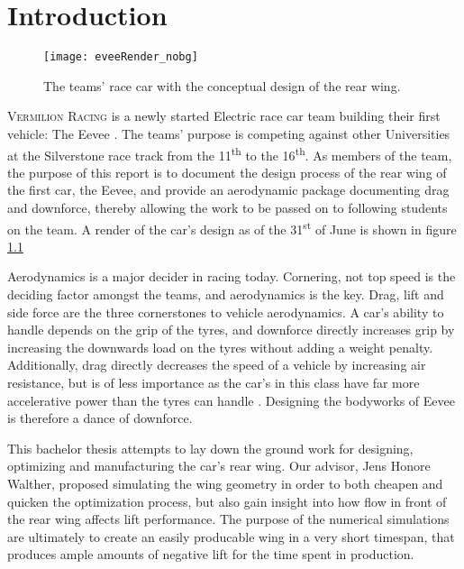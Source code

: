 \chapter{Introduction}

  \begin{figure}
    \texttt{[image: eveeRender\_nobg]}
    \caption{The teams' race car with the conceptual design of the rear wing.}
    \label{fig:EeveeRender}
  \end{figure}

  \textsc{Vermilion Racing} is a newly started Electric race car team building their first vehicle: The Eevee \cite{bulba}. The teams' purpose is competing against other Universities at the Silverstone race track from the 11\textsuperscript{th} to the 16\textsuperscript{th}. As members of the team, the purpose of this report is to document the design process of the rear wing of the first car, the Eevee, and provide an aerodynamic package documenting drag and downforce, thereby allowing the work to be passed on to following students on the team. A render of the car's design as of the 31\textsuperscript{st} of June is shown in figure \ref{fig:EeveeRender}

  Aerodynamics is a major decider in racing today. Cornering, not top speed is the deciding factor amongst the teams, and aerodynamics is the key. Drag, lift and side force are the three cornerstones to vehicle aerodynamics. A car's ability to handle depends on the grip of the tyres, and downforce directly increases grip by increasing the downwards load on the tyres without adding a weight penalty. Additionally, drag directly decreases the speed of a vehicle by increasing air resistance, but is of less importance as the car's in this class have far more accelerative power than the tyres can handle \cite{jkatz}. Designing the bodyworks of Eevee is therefore a dance of downforce.

  This bachelor thesis attempts to lay down the ground work for designing, optimizing and manufacturing the car's rear wing. Our advisor, Jens Honore Walther, proposed simulating the wing geometry in order to both cheapen and quicken the optimization process, but also gain insight into how flow in front of the rear wing affects lift performance. The purpose of the numerical simulations are ultimately to create an easily producable wing in a very short timespan, that produces ample amounts of negative lift for the time spent in production. 


